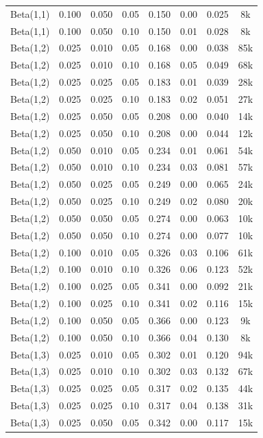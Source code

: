 \begin{table}
\begin{center}
\begin{small}
\begin{sc}
\begin{tabular}{lccc|cccc}
Beta(1,1) & 0.100 & 0.050 & 0.05 & 0.150 & 0.00 & 0.025 & 8k \\
Beta(1,1) & 0.100 & 0.050 & 0.10 & 0.150 & 0.01 & 0.028 & 8k \\
Beta(1,2) & 0.025 & 0.010 & 0.05 & 0.168 & 0.00 & 0.038 & 85k \\
Beta(1,2) & 0.025 & 0.010 & 0.10 & 0.168 & 0.05 & 0.049 & 68k \\
Beta(1,2) & 0.025 & 0.025 & 0.05 & 0.183 & 0.01 & 0.039 & 28k \\
Beta(1,2) & 0.025 & 0.025 & 0.10 & 0.183 & 0.02 & 0.051 & 27k \\
Beta(1,2) & 0.025 & 0.050 & 0.05 & 0.208 & 0.00 & 0.040 & 14k \\
Beta(1,2) & 0.025 & 0.050 & 0.10 & 0.208 & 0.00 & 0.044 & 12k \\
Beta(1,2) & 0.050 & 0.010 & 0.05 & 0.234 & 0.01 & 0.061 & 54k \\
Beta(1,2) & 0.050 & 0.010 & 0.10 & 0.234 & 0.03 & 0.081 & 57k \\
Beta(1,2) & 0.050 & 0.025 & 0.05 & 0.249 & 0.00 & 0.065 & 24k \\
Beta(1,2) & 0.050 & 0.025 & 0.10 & 0.249 & 0.02 & 0.080 & 20k \\
Beta(1,2) & 0.050 & 0.050 & 0.05 & 0.274 & 0.00 & 0.063 & 10k \\
Beta(1,2) & 0.050 & 0.050 & 0.10 & 0.274 & 0.00 & 0.077 & 10k \\
Beta(1,2) & 0.100 & 0.010 & 0.05 & 0.326 & 0.03 & 0.106 & 61k \\
Beta(1,2) & 0.100 & 0.010 & 0.10 & 0.326 & 0.06 & 0.123 & 52k \\
Beta(1,2) & 0.100 & 0.025 & 0.05 & 0.341 & 0.00 & 0.092 & 21k \\
Beta(1,2) & 0.100 & 0.025 & 0.10 & 0.341 & 0.02 & 0.116 & 15k \\
Beta(1,2) & 0.100 & 0.050 & 0.05 & 0.366 & 0.00 & 0.123 & 9k \\
Beta(1,2) & 0.100 & 0.050 & 0.10 & 0.366 & 0.04 & 0.130 & 8k \\
Beta(1,3) & 0.025 & 0.010 & 0.05 & 0.302 & 0.01 & 0.120 & 94k \\
Beta(1,3) & 0.025 & 0.010 & 0.10 & 0.302 & 0.03 & 0.132 & 67k \\
Beta(1,3) & 0.025 & 0.025 & 0.05 & 0.317 & 0.02 & 0.135 & 44k \\
Beta(1,3) & 0.025 & 0.025 & 0.10 & 0.317 & 0.04 & 0.138 & 31k \\
Beta(1,3) & 0.025 & 0.050 & 0.05 & 0.342 & 0.00 & 0.117 & 15k \\

\end{tabular}
\end{sc}
\end{small}
\end{center}
\end{table}
